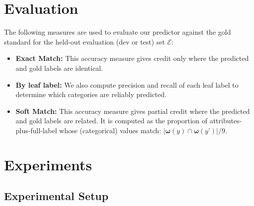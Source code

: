 \documentclass[11pt,letterpaper]{article}
\newcommand{\ensuretext}[1]{#1}
\newcommand{\cjdmarker}{\ensuretext{\textcolor{green}{\ensuremath{^{\textsc{CJ}}_{\textsc{D}}}}}}
\newcommand{\nssmarker}{\ensuretext{\textcolor{magenta}{\ensuremath{^{\textsc{NS}}_{\textsc{S}}}}}}
\newcommand{\arkcomment}[3]{\ensuretext{\textcolor{#3}{[#1 #2]}}}
\newcommand{\cjd}[1]{\arkcomment{\cjdmarker}{#1}{green}}
\newcommand{\nss}[1]{\arkcomment{\nssmarker}{#1}{magenta}}
\newcommand{\finalversion}[1]{}
\newcommand{\costversion}[1]{}
\begin{document}
\section{Evaluation}\label{sec:eval}

The following measures are used to evaluate our predictor against the gold standard 
for the held-out evaluation (dev or test) set $\mathcal{E}$:
\begin{itemize}
  \item \textbf{Exact Match:} This accuracy measure gives credit only where the predicted and gold labels 
  are identical.\costversion{\nss{} When the model is allowed to predict internal labels, we will report 
  overall precision and recall of leaf labels. Otherwise, we report accuracy.}
  \item \textbf{By leaf label:} We also compute precision and recall of each leaf label 
  to determine which categories are reliably predicted.
  \item \textbf{Soft Match:} This accuracy measure gives partial credit where the predicted and gold labels 
  are related. It is computed as the proportion of attributes-plus-full-label whose (categorical) values match: 
  \mbox{$|\boldsymbol{\omega}(y) \cap \boldsymbol{\omega}(y’)|/9$}.\finalversion{\cjd{Should these be differentially weighted based on their height in the hierarchy?}}
\end{itemize}

\section{Experiments}\label{sec:exp}

\subsection{Experimental Setup}\label{sec:exptsetup}
\end{document}
